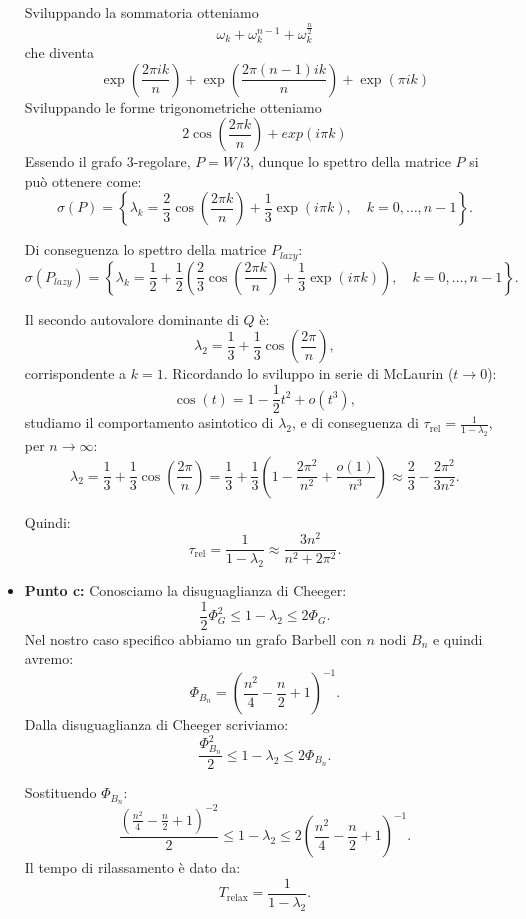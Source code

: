 \documentclass[a4paper,12pt]{article}
\begin{document}
\begin{itemize}
	    Sviluppando la sommatoria otteniamo\\
	    \[
	    \omega_k + \omega_k^{n-1} + \omega_k^{\frac{n}{2}}
	    \]
	    che diventa\\
	    \[
	    \exp\left(\frac{2 \pi i k}{n}\right) + \exp\left(\frac{2 \pi (n-1) i k}{n}\right) + \exp\left(\pi i k\right)
	    \]
	    Sviluppando le forme trigonometriche otteniamo\\
	    \[
	    2 \cos(\frac{2 \pi k}{n}) + exp(i \pi k)
	    \]
		Essendo il grafo 3-regolare, \( P = W / 3 \), dunque lo spettro della matrice \( P \) si può ottenere come:
		\[
		\sigma(P) = \left\{\lambda_k = \frac{2}{3} \cos\left(\frac{2 \pi k}{n}\right) + \frac{1}{3} \exp(i \pi k), \quad k = 0, \ldots, n-1 \right\}.
		\]
		
		Di conseguenza lo spettro della matrice $P_{lazy}$:
		\[
		\sigma(P_{lazy}) = \left\{\lambda_k = \frac{1}{2} + \frac{1}{2}(\frac{2}{3} \cos\left(\frac{2 \pi k}{n}\right) + \frac{1}{3} \exp(i \pi k)) , \quad k = 0, \ldots, n-1 \right\}.
		\]
		
		Il secondo autovalore dominante di \( Q \) è:
		\[
		\lambda_2 = \frac{1}{3} + \frac{1}{3} \cos\left(\frac{2 \pi}{n}\right),
		\]
		corrispondente a \( k = 1 \). Ricordando lo sviluppo in serie di McLaurin (\( t \to 0 \)):
		\[
		\cos(t) = 1 - \frac{1}{2}t^2 + o(t^3),
		\]
		studiamo il comportamento asintotico di \( \lambda_2 \), e di conseguenza di \( \tau_{\text{rel}} = \frac{1}{1 - \lambda_2} \), per \( n \to \infty \):
		\[
		\lambda_2 = \frac{1}{3} + \frac{1}{3}\cos\left(\frac{2 \pi}{n}\right) = \frac{1}{3} + \frac{1}{3}\left(1 - \frac{2 \pi^2}{n^2} + \frac{o(1)}{n^3}\right) \approx \frac{2}{3} - \frac{2 \pi^2}{3 n^2}.
		\]
		
		Quindi:
		\[
		\tau_{\text{rel}} = \frac{1}{1 - \lambda_2} \approx \frac{3 n^2}{n^2 + 2 \pi^2}.
		\]
		\item \textbf{Punto c: }
		Conosciamo la disuguaglianza di Cheeger:\\
		\[
		\frac{1}{2} \Phi_G^2 \leq 1 - \lambda_2 \leq 2 \Phi_G.
		\]
		Nel nostro caso specifico abbiamo un grafo Barbell con $n$ nodi $B_n$ e quindi avremo:\\
		\[
		\Phi_{B_n} = \left( \frac{n^2}{4} - \frac{n}{2} + 1 \right)^{-1}.
		\]
		Dalla disuguaglianza di Cheeger scriviamo:
		\[
		\frac{\Phi_{B_n}^2}{2} \leq 1 - \lambda_2 \leq 2 \Phi_{B_n}.
		\]
		
		Sostituendo \(\Phi_{B_n}\):
		\[
		\frac{\left(\frac{n^2}{4} - \frac{n}{2} + 1 \right)^{-2}}{2} \leq 1 - \lambda_2 \leq 2 \left(\frac{n^2}{4} - \frac{n}{2} + 1 \right)^{-1}.
		\]
		Il tempo di rilassamento è dato da:
		\[
		T_{\text{relax}} = \frac{1}{1 - \lambda_2}.
		\]
		

\end{itemize}
\end{document}

